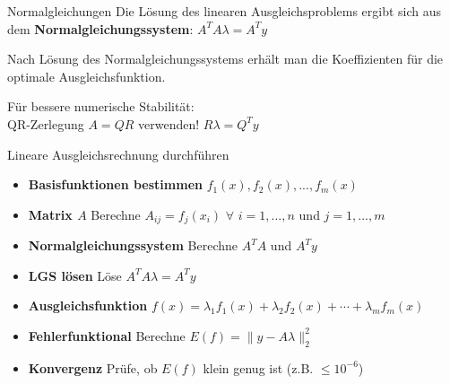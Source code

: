 \begin{theorem}{Normalgleichungen}
Die Lösung des linearen Ausgleichsproblems ergibt sich aus dem \textbf{Normalgleichungssystem}:
$A^T A \lambda = A^T y$

Nach Lösung des Normalgleichungssystems erhält man die Koeffizienten für die optimale Ausgleichsfunktion.

Für bessere numerische Stabilität: \\ QR-Zerlegung $A = QR$ verwenden!
$R\lambda = Q^T y$
\end{theorem}

\begin{KR}{Lineare Ausgleichsrechnung durchführen}

    \begin{itemize}
        \item \textbf{Basisfunktionen bestimmen} $f_1(x), f_2(x), ..., f_m(x)$
        \item \textbf{Matrix $A$} Berechne $A_{ij} = f_j(x_i)$ $\forall$ $i = 1, ..., n$ und $j = 1, ..., m$
        \item \textbf{Normalgleichungssystem} Berechne $A^T A$ und $A^T y$
        \item \textbf{LGS lösen} Löse $A^T A \lambda = A^T y$ 
        \item \textbf{Ausgleichsfunktion} $f(x) = \lambda_1 f_1(x) + \lambda_2 f_2(x) + \cdots + \lambda_m f_m(x)$
        \item \textbf{Fehlerfunktional} Berechne $E(f) = \|y - A\lambda\|_2^2$
        \item \textbf{Konvergenz} Prüfe, ob $E(f)$ klein genug ist (z.B. $\leq 10^{-6}$)
    \end{itemize}
\end{KR}

